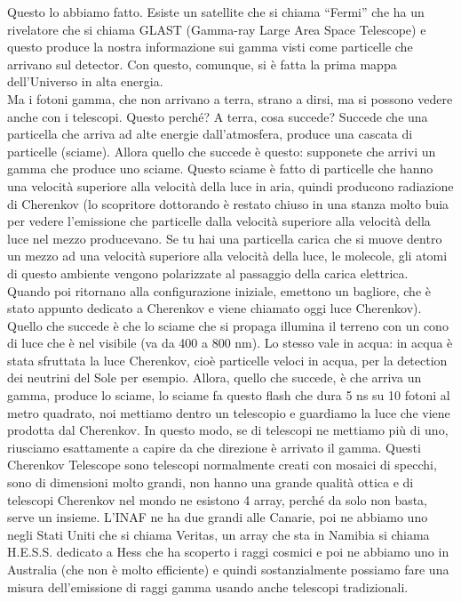 \documentclass[a4paper,11pt]{article}
\begin{document}
Questo lo abbiamo fatto. Esiste un satellite che si chiama “Fermi” che ha un rivelatore che si chiama GLAST (Gamma-ray Large Area Space Telescope) e questo produce la nostra informazione sui gamma visti come particelle che arrivano sul detector. Con questo, comunque, si è fatta la prima mappa dell’Universo in alta energia.\\
Ma i fotoni gamma, che non arrivano a terra, strano a dirsi, ma si possono vedere anche con i telescopi. Questo perché? A terra, cosa succede? Succede che una particella che arriva ad alte energie dall’atmosfera, produce una cascata di particelle (sciame). Allora quello che succede è questo: supponete che arrivi un gamma che produce uno sciame. Questo sciame è fatto di particelle che hanno una velocità superiore alla velocità della luce in aria, quindi producono radiazione di Cherenkov (lo scopritore dottorando è restato chiuso in una stanza molto buia per vedere l’emissione che particelle dalla velocità superiore alla velocità della luce nel mezzo producevano. Se tu hai una particella carica che si muove dentro un mezzo ad una velocità superiore alla velocità della luce, le molecole, gli atomi di questo ambiente vengono polarizzate al passaggio della carica elettrica. Quando poi ritornano alla configurazione iniziale, emettono un bagliore, che è stato appunto dedicato a Cherenkov e viene chiamato oggi luce Cherenkov). Quello che succede è che lo sciame che si propaga illumina il terreno con un cono di luce che è nel visibile (va da 400 a 800 nm). Lo stesso vale in acqua: in acqua è stata sfruttata la luce Cherenkov, cioè particelle veloci in acqua, per la detection dei neutrini del Sole per esempio. Allora, quello che succede, è che arriva un gamma, produce lo sciame, lo sciame fa questo flash che dura 5 ns su 10 fotoni al metro quadrato, noi mettiamo dentro un telescopio e guardiamo la luce che viene prodotta dal Cherenkov. In questo modo, se di telescopi ne mettiamo più di uno, riusciamo esattamente a capire da che direzione è arrivato il gamma. Questi Cherenkov Telescope sono telescopi normalmente creati con mosaici di specchi, sono di dimensioni molto grandi, non hanno una grande qualità ottica e di telescopi Cherenkov nel mondo ne esistono 4 array, perché da solo non basta, serve un insieme.
L’INAF ne ha due grandi alle Canarie, poi ne abbiamo uno negli Stati Uniti che si chiama Veritas, un array che sta in Namibia si chiama H.E.S.S. dedicato a Hess che ha scoperto i raggi cosmici e poi ne abbiamo uno in Australia (che non è molto efficiente) e quindi sostanzialmente possiamo fare una misura dell’emissione di raggi gamma usando anche telescopi tradizionali. 
\end{document}
